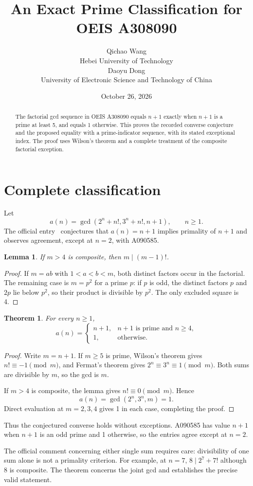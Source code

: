 \documentclass[10pt]{article}
\title{An Exact Prime Classification for OEIS A308090}
\author{Qichao Wang\\{\small Hebei University of Technology}\\[0.3em]
Daoyu Dong\\{\small University of Electronic Science and Technology of China}}
\date{October 26, 2026}
\newtheorem{theorem}{Theorem}
\newtheorem{lemma}{Lemma}
\begin{document}
\maketitle
\begin{abstract}
The factorial gcd sequence in OEIS A308090 equals $n+1$ exactly when $n+1$ is a prime at least 5, and equals 1 otherwise. This proves the recorded converse conjecture and the proposed equality with a prime-indicator sequence, with its stated exceptional index. The proof uses Wilson's theorem and a complete treatment of the composite factorial exception.
\end{abstract}
\section{Complete classification}
Let
\[
 a(n)=\gcd(2^n+n!,3^n+n!,n+1),\qquad n\ge1.
\]
The official entry~\cite{oeis} conjectures that $a(n)=n+1$ implies primality of $n+1$ and observes agreement, except at $n=2$, with A090585.
\begin{lemma}
If $m>4$ is composite, then $m\mid(m-1)!$.
\end{lemma}
\begin{proof}
If $m=ab$ with $1<a<b<m$, both distinct factors occur in the factorial. The remaining case is $m=p^2$ for a prime $p$: if $p$ is odd, the distinct factors $p$ and $2p$ lie below $p^2$, so their product is divisible by $p^2$. The only excluded square is 4.
\end{proof}
\begin{theorem}
For every $n\ge1$,
\[
 a(n)=\begin{cases}n+1,&n+1\text{ is prime and }n\ge4,\\1,&\text{otherwise}.\end{cases}
\]
\end{theorem}
\begin{proof}
Write $m=n+1$. If $m\ge5$ is prime, Wilson's theorem gives $n!\equiv-1\pmod m$, and Fermat's theorem gives $2^n\equiv3^n\equiv1\pmod m$. Both sums are divisible by $m$, so the gcd is $m$.

If $m>4$ is composite, the lemma gives $n!\equiv0\pmod m$. Hence
\[
 a(n)=\gcd(2^n,3^n,m)=1.
\]
Direct evaluation at $m=2,3,4$ gives 1 in each case, completing the proof.
\end{proof}
Thus the conjectured converse holds without exceptions. A090585 has value $n+1$ when $n+1$ is an odd prime and 1 otherwise, so the entries agree except at $n=2$.

The official comment concerning either single sum requires care: divisibility of one sum alone is not a primality criterion. For example, at $n=7$, $8\mid2^7+7!$ although 8 is composite. The theorem concerns the joint gcd and establishes the precise valid statement.
\end{document}
